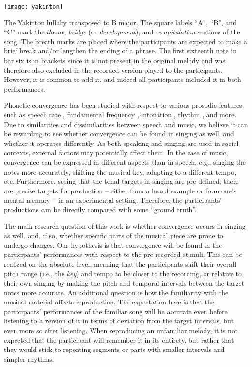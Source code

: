 \begin{snippet}[t]
	\centering
	\texttt{[image: yakinton]}
	\caption{The Yakinton lullaby transposed to B major.
		The square labels \enquote{A}, \enquote{B}, and \enquote{C} mark the \emph{theme}, \emph{bridge} (or \emph{development}), and \emph{recapitulation} sections of the song.
		The breath marks are placed where the participants are expected to make a brief break and/or lengthen the ending of a phrase.
		The first sixteenth note in bar six is in brackets since it is not present in the original melody and was therefore also excluded in the recorded version played to the participants.
		However, it is common to add it, and indeed all participants included it in both performances.}
	\label{snippet:yakinton}
\end{snippet}

Phonetic convergence has been studied with respect to various prosodic features, such as speech rate \citep{Schweitzer2013convergence, Pardo2012phonetic}, fundamental frequency \citep{Babel2012role, Collins1998convergence}, intonation \citep{DImperio2014phonetic, Simonet2011intonational}, rhythm \citep{Krivokapic2013rhythm}, and more.
Due to similarities and dissimilarities between speech and music, we believe it can be rewarding to see whether convergence can be found in singing as well, and whether it operates differently.
As both speaking and singing are used in social contexts, external factors may potentially affect them.
In the case of music, convergence can be expressed in different aspects than in speech, e.g., singing the notes more accurately, shifting the musical key, adapting to a different tempo, etc.
Furthermore, seeing that the tonal targets in singing are pre-defined, there are precise targets for production -- either from a heard example or from one's mental memory -- in an experimental setting.
Therefore, the participants' productions can be directly compared with some \enquote{ground truth}.

The main research question of this work is whether convergence occurs in singing as well, and, if so, whether specific parts of the musical piece are prone to undergo changes.
Our hypothesis is that convergence will be found in the participants' performances with respect to the pre-recorded stimuli.
This can be realized on the absolute level, meaning that the participants shift their overall pitch range (i.e., the \emph{key}) and tempo to be closer to the recording, or relative to their own singing by making the pitch and temporal intervals between the target notes more accurate.
An additional question is how the familiarity with the musical material affects reproduction.
The expectation here is that the participants' performances of the familiar song will be accurate even before listening to a version of it in terms of deviation from the target intervals, but even more so after listening.
When reproducing an unfamiliar melody, it is not expected that the participant will remember it in its entirety, but rather that they would stick to repeating segments or parts with smaller intervals and simpler rhythms.

